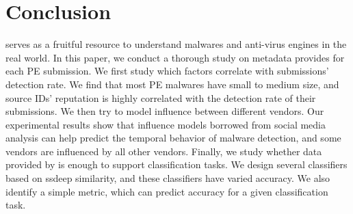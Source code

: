 \section{Conclusion}
\label{sec:con}

\vt{} serves as a fruitful resource to understand malwares and anti-virus engines in the real world. 
In this paper, 
we conduct a thorough study on metadata \vt{} provides for each PE submission. 
We first study which factors correlate with submissions' detection rate. 
We find that most PE malwares have small to medium size, 
and source IDs' reputation is highly correlated with the detection rate of their submissions. 
We then try to model influence between different vendors. 
Our experimental results show that   
influence models borrowed from social media analysis can help predict the temporal behavior of malware detection, 
and some vendors are influenced by all other vendors.
Finally, we study whether data provided by \vt{} is enough to support classification tasks. 
We design several classifiers based on ssdeep similarity, and these classifiers have varied accuracy. 
We also identify a simple metric, which can predict accuracy for a given classification
task.
